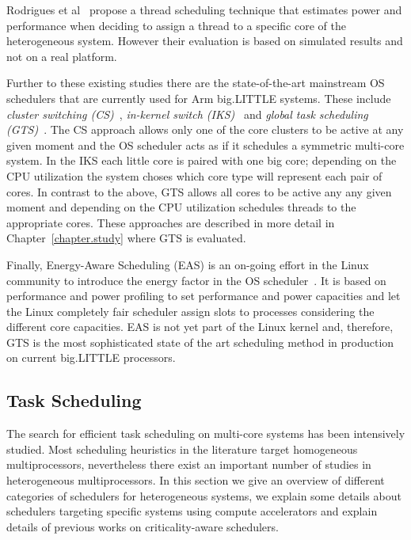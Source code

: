Rodrigues et al~\cite{Rodrigues_thread_scheduling} propose a thread scheduling technique that estimates power and performance when deciding to assign a thread to a specific core of the heterogeneous system. 
However their evaluation is based on simulated results and not on a real platform. %

Further to these existing studies there are the state-of-the-art mainstream OS schedulers that are currently used for Arm big.LITTLE systems.
These include \textit{cluster switching (CS)}~\cite{samsung}, 
\textit{in-kernel switch (IKS)}~\cite{IKS} and \textit{global task scheduling (GTS)}~\cite{samsung}.
The CS approach allows only one of the core clusters to be active at any given moment and the OS scheduler acts as if it schedules a symmetric multi-core system.
In the IKS each little core is paired with one big core; depending on the CPU utilization the system choses which core type will represent each pair of cores.
In contrast to the above, GTS allows all cores to be active any any given moment and depending on the CPU utilization schedules threads to the appropriate cores.
These approaches are described in more detail in Chapter~\ref{chapter.study} where GTS is evaluated.

Finally, Energy-Aware Scheduling (EAS) is an on-going effort in the Linux community to introduce the energy factor in the OS scheduler~\cite{EAS, EAS_Linux}. 
It is based on performance and power profiling to set performance and power capacities and let the Linux completely fair scheduler assign slots to processes considering the different core capacities. 
EAS is not yet part of the Linux kernel and, therefore, GTS is the most sophisticated state of the art scheduling method in production on current big.LITTLE processors.


\subsection{Task Scheduling}

The search for efficient task scheduling on multi-core systems has been intensively studied. 
Most scheduling heuristics in the literature target homogeneous multiprocessors, nevertheless there exist an important number of studies in heterogeneous multiprocessors. 
In this section we give an overview of different categories of schedulers for heterogeneous systems, we explain some details about schedulers targeting specific systems using compute accelerators and explain details of previous works on criticality-aware schedulers.


